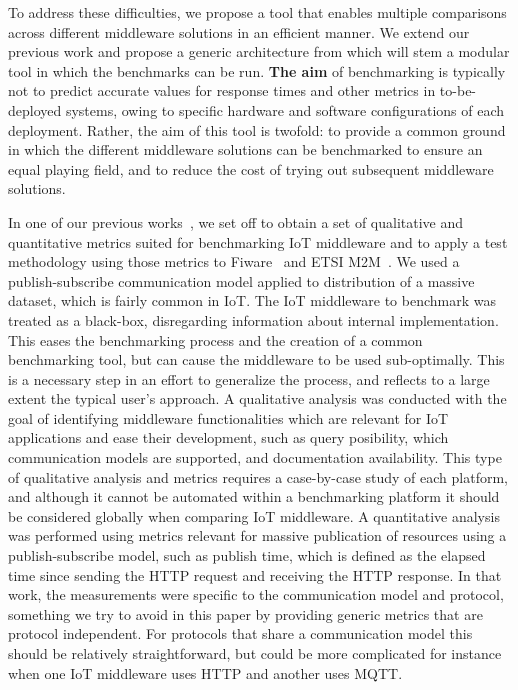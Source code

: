 \documentclass[conference]{IEEEtran}
\begin{document}
To address these difficulties, we propose a tool that enables multiple comparisons across different middleware solutions in an efficient manner. We extend our previous work and propose a generic architecture from which will stem a modular tool in which the benchmarks can be run. 
\textbf{The aim} of benchmarking is typically not to predict accurate values for response times and other metrics in to-be-deployed systems, owing to specific hardware and software configurations of each deployment. Rather, the aim of this tool is twofold: 
to provide a common ground in which the different middleware solutions can be benchmarked to ensure an equal playing field, and to reduce the cost of trying out subsequent middleware solutions.  

In one of our previous works~\cite{cardoso_benchmarking_2017}, we set off to obtain a set of qualitative and quantitative metrics suited for benchmarking IoT middleware and to apply a test methodology using those metrics to Fiware~\cite{FIWARE27:online} and ETSI M2M~\cite{ETSIWelc14:online}. %
We used a publish-subscribe communication model applied to distribution of a massive dataset, which is fairly common in IoT. The IoT middleware to benchmark was treated as a black-box, disregarding information about internal implementation. This eases the benchmarking process and the creation of a common benchmarking tool, but can cause the middleware to be used sub-optimally. This is a necessary step in an effort to generalize the process, and reflects to a large extent the typical user's approach. A qualitative analysis was conducted with the goal of identifying middleware functionalities which are relevant for IoT applications and ease their development, such as query posibility, which communication models are supported, and documentation availability. This type of qualitative analysis and metrics requires a case-by-case study of each platform, and although it cannot be automated within a benchmarking platform it should be considered globally when comparing IoT middleware. A quantitative analysis was performed using metrics relevant for massive publication of resources using a publish-subscribe model, such as publish time, which is defined as the elapsed time since sending the HTTP request and receiving the HTTP response. In that work, the measurements were specific to the communication model and protocol, something we  try to avoid in this paper by providing generic metrics that are protocol independent. For protocols that share a communication model this should be relatively straightforward, but could be more complicated for instance when one IoT middleware uses HTTP and another uses MQTT\@.
\end{document}
